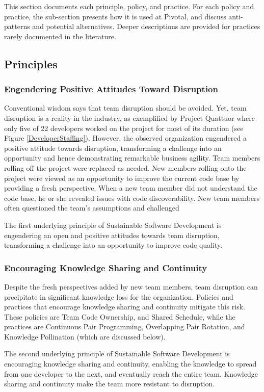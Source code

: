 This section documents each principle, policy, and practice. For each policy and practice, the sub-section presents how it is used at Pivotal, and discuss anti-patterns and potential alternatives. Deeper descriptions are provided for practices rarely documented in the literature.
\subsection{Principles}

\subsubsection{Engendering Positive Attitudes Toward Disruption}
Conventional wisdom says that team disruption should be avoided. Yet, team disruption is a reality in the industry, as exemplified by Project Quattuor where only five of 22 developers worked on the project for most of its duration (see Figure \ref{DeveloperStaffing}). However, the observed organization engendered a positive attitude towards disruption, transforming a challenge into an opportunity and hence demonstrating remarkable business agility. Team members rolling off the project were replaced as needed. New members rolling onto the project were viewed as an opportunity to improve the current code base by providing a fresh perspective. When a new team member did not understand the code base, he or she revealed issues with code discoverability. New team members often questioned the team's assumptions and challenged  

The first underlying principle of Sustainable Software Development is engendering an open and positive attitudes towards team disruption, transforming a challenge into an opportunity to improve code quality.

\subsubsection{Encouraging Knowledge Sharing and Continuity}
Despite the fresh perspectives added by new team members, team disruption can precipitate in significant knowledge loss for the organization. Policies and practices that encourage knowledge sharing and continuity mitigate this risk. These policies are Team Code Ownership, and Shared Schedule, while the practices are Continuous Pair Programming, Overlapping Pair Rotation, and Knowledge Pollination (which are discussed below).

The second underlying principle of Sustainable Software Development is encouraging knowledge sharing and continuity, enabling the knowledge to spread from one developer to the next, and eventually reach the entire team. Knowledge sharing and continuity make the team more resistant to disruption. 

